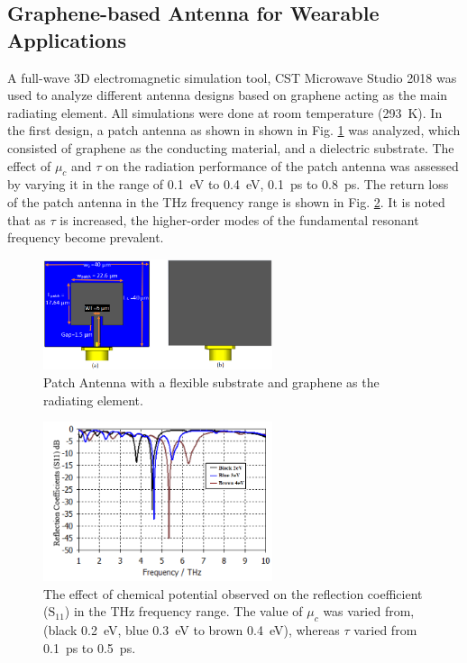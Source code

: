 \documentclass[12pt]{suhbook}
\begin{document}
\subsection{Graphene-based Antenna for Wearable Applications}
% 
A full-wave 3D electromagnetic simulation tool, CST Microwave Studio 2018 was used to analyze different antenna designs based on graphene acting as the main radiating element. All simulations were done at room temperature (\SI{293}{\kelvin}). In the first design, a patch antenna as shown in shown in Fig. \ref{Fig 1} was analyzed, which consisted of graphene as the conducting material, and a dielectric substrate. The effect of $\mu_c$ and $\tau$ on the radiation performance of the patch antenna was assessed by varying it in the range of \SI{0.1}{\eV} to \SI{0.4}{\eV},  \SI{0.1}{\ps} to \SI{0.8}{\ps}. The return loss of the patch antenna in the THz frequency range is shown in Fig. \ref{Fig 2}. It is noted that as $\tau$ is increased, the higher-order modes of the fundamental resonant frequency become prevalent.
% 
\begin{figure}[hbt!]
    \centering
    \includegraphics[width=0.6\textwidth]{1}
    \caption{Patch Antenna with a flexible substrate and graphene as the radiating element.}
    \label{Fig 1}
\end{figure}
% 
\begin{figure}[h]
    \centering    \includegraphics[width=0.6\textwidth]{2}
    \caption{The effect of chemical potential observed on the reflection coefficient ($\mathrm{S_{11}}$) in the THz frequency range. The value of $\mu_c$ was varied from, (black \SI{.2}{\eV}, blue \SI{.3}{\eV} to brown \SI{.4}{\eV}), whereas $\tau$ varied from \SI{.1}{\ps} to \SI{.5}{\ps}. }
    \label{Fig 2}
\end{figure}
\end{document}
